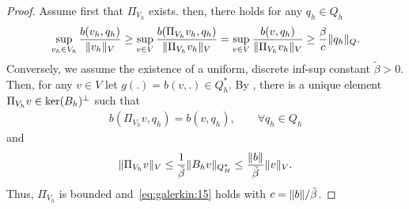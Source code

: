 \begin{proof}
  Assume first that $\Pi_{V_h}$ exists. then, there holds for any
  $q_h\in Q_h$
  \begin{gather*}
    \sup_{v_h\in V_h} \frac{b(v_h, q_h)}{\lVert v_h\rVert_V}
    \ge
    \sup_{v\in V} \frac{b(\Pi_{V_h}v_h, q_h)}{\lVert\Pi_{V_h} v_h\rVert_V}
    =
    \sup_{v\in V} \frac{b(v, q_h)}{\lVert\Pi_{V_h} v_h\rVert_V}
    \ge \frac{\beta}{c} \lVert q_h\rVert_Q.
  \end{gather*}
  Conversely, we assume the existence of a uniform, discrete inf-sup
  constant $\tilde\beta>0$. Then, for any $v\in V$ let
  $g(.) = b(v,.) \in Q_h^*$. By
  , there is a unique
  element $\Pi_{V_h} v \in \operatorname{ker}(B_h)^\perp$ such that
  \begin{gather*}
    b(\Pi_{V_h}v,q_h) = b(v, q_h),\qquad\forall q_h\in Q_h
  \end{gather*}
  and
  \begin{gather*}
    \lVert\Pi_{V_h}v\rVert_V
    \le \frac1{\tilde\beta}\lVert B_h v\rVert_{Q_H^*}
    \le \frac{\lVert b\rVert}{\tilde\beta} \lVert v\rVert_V.
  \end{gather*}
  Thus, $\Pi_{V_h}$ is bounded and~\eqref{eq:galerkin:15} holds with
  $c=\lVert b\rVert/\tilde\beta$.
\end{proof}




